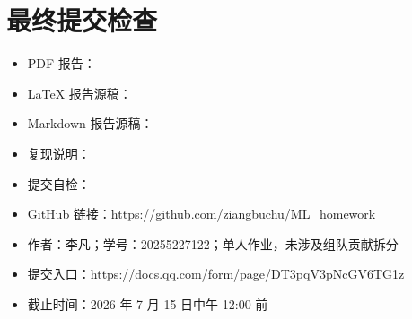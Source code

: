 \documentclass[11pt,a4paper]{article}
\begin{document}
\section*{最终提交检查}
\begin{itemize}[leftmargin=1.4em]
  \item PDF 报告：
  \item LaTeX 报告源稿：
  \item Markdown 报告源稿：
  \item 复现说明：
  \item 提交自检：
  \item GitHub 链接：\href{https://github.com/ziangbuchu/ML_homework}{https://github.com/ziangbuchu/ML\_homework}
  \item 作者：李凡；学号：20255227122；单人作业，未涉及组队贡献拆分
  \item 提交入口：\href{https://docs.qq.com/form/page/DT3pqV3pNcGV6TG1z}{https://docs.qq.com/form/page/DT3pqV3pNcGV6TG1z}
  \item 截止时间：2026 年 7 月 15 日中午 12:00 前
\end{itemize}
\end{document}
